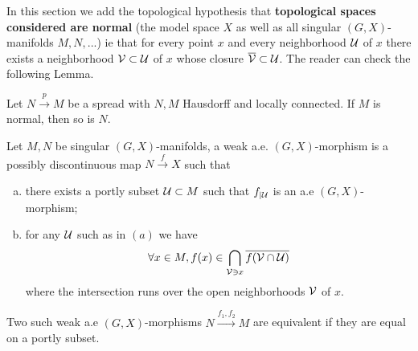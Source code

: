 In this section we add the topological hypothesis that \textbf{topological spaces considered are normal} (the model space $X$ as well as all singular $(G,X)$-manifolds $M,N,...$)  ie that for every point $x$ and every neighborhood $\mathcal{U}$ of $x$ there exists a neighborhood $\mathcal V\subset \mathcal{U}$ of $x$ whose closure $\overline {\mathcal V} \subset \mathcal{U}$.
The reader can check the following Lemma.
\begin{lem} Let $N\xrightarrow{p}M$ be a spread with $N,M$ Hausdorff and locally connected. 
If $M$ is normal, then so is $N$.
\end{lem}


\begin{defi}
Let $M,N$ be singular $(G,X)$-manifolds, a weak a.e. $(G,X)$-morphism  is a possibly discontinuous map 
$N\xrightarrow{f} X$ such that 
\begin{enumerate}[(a)]
 \item there exists a portly subset $\mathcal{U}\subset M$ such that $f_{|\mathcal{U}}$ is an a.e $
 (G,X)$-morphism;
 \item for any $\mathcal{U}$ such as in $(a)$ we have 
 $$\forall x\in M, f(x) \in \bigcap_{\mathcal V\ni x} \overline {f(\mathcal V\cap \mathcal{U})}$$
 where the intersection runs over the open neighborhoods $\mathcal V$ of $x$. 
\end{enumerate}

Two such weak a.e $(G,X)$-morphisms $N\xrightarrow{f_1,f_2}M$ are equivalent if they are equal on a portly subset.
\end{defi}



